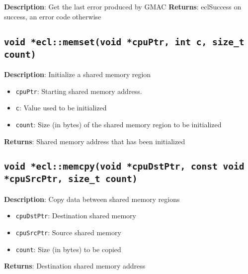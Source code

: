\textbf{Description}: Get the last error produced by GMAC
\textbf{Returns}: eclSuccess on success, an error code otherwise

\subsection{\texttt{void *ecl::memset(void *cpuPtr, int c, size\_t count)}}

\textbf{Description}: Initialize a shared memory region
\begin{itemize}
  \item \texttt{cpuPtr}: Starting shared memory address.
  \item \texttt{c}: Value used to be initialized
  \item \texttt{count}: Size (in bytes) of the shared memory region to be initialized
\end{itemize}
\textbf{Returns}: Shared memory address that has been initialized

\subsection{\texttt{void *ecl::memcpy(void *cpuDstPtr, const void *cpuSrcPtr, size\_t count)}}

\textbf{Description}: Copy data between shared memory regions
\begin{itemize}
  \item \texttt{cpuDstPtr}: Destination shared memory
  \item \texttt{cpuSrcPtr}: Source shared memory
  \item \texttt{count}: Size (in bytes) to be copied
\end{itemize}
\textbf{Returns}: Destination shared memory address

